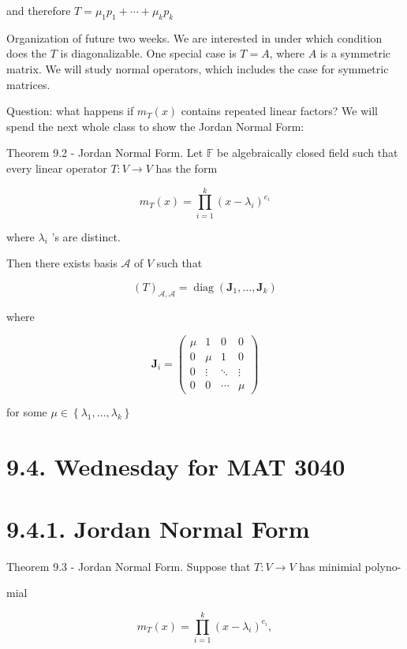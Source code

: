 \documentclass[11pt]{article}
\begin{document}
and therefore \(T = {\mu }_1{p}_1 + \cdots  + {\mu }_{k}{p}_{k}\)

Organization of future two weeks. We are interested in under which condition does the \(T\) is diagonalizable. One special case is \(T = A\), where \(A\) is a symmetric matrix. We will study normal operators, which includes the case for symmetric matrices.

Question: what happens if \({m}_{T}\left( x\right)\) contains repeated linear factors? We will spend the next whole class to show the Jordan Normal Form:

Theorem 9.2 - Jordan Normal Form. Let \(\mathbb{F}\) be algebraically closed field such that every linear operator \(T : V \rightarrow  V\) has the form

\[
{m}_{T}\left( x\right)  = \mathop{\prod }\limits_{{i = 1}}^{k}{\left( x - {\lambda }_{i}\right) }^{{e}_{i}}
\]

where \({\lambda }_{i}\) ’s are distinct.

Then there exists basis \(\mathcal{A}\) of \(V\) such that

\[
{\left( T\right) }_{\mathcal{A},\mathcal{A}} = \operatorname{diag}\left( {{\mathbf{J}}_1,\ldots ,{\mathbf{J}}_{k}}\right)
\]

where

\[
{\mathbf{J}}_{i} = \left( \begin{matrix} \mu & 1 & 0 & 0 \\  0 & \mu & 1 & 0 \\  0 & \vdots &  \ddots  & \vdots \\  0 & 0 & \cdots & \mu  \end{matrix}\right)
\]

for some \(\mu  \in  \left\{  {{\lambda }_1,\ldots ,{\lambda }_{k}}\right\}\)

\section*{9.4. Wednesday for MAT 3040}

\section*{9.4.1. Jordan Normal Form}

Theorem 9.3 - Jordan Normal Form. Suppose that \(T : V \rightarrow  V\) has minimial polyno-

mial

\[
{m}_{T}\left( x\right)  = \mathop{\prod }\limits_{{i = 1}}^{k}{\left( x - {\lambda }_{i}\right) }^{{e}_{i}},
\]
\end{document}
